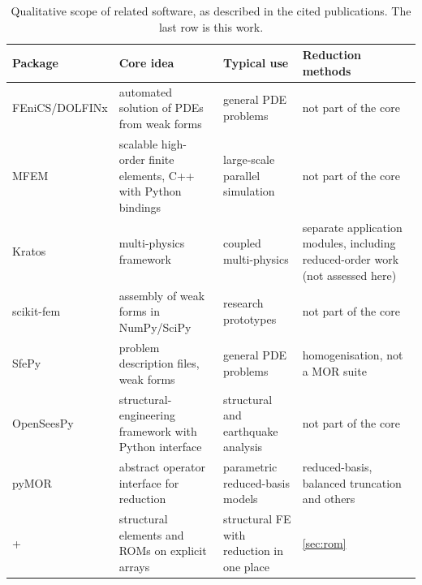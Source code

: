\begin{table}[t]
\centering\footnotesize
\caption{Qualitative scope of related software, as described in the cited publications. The last row is this work.}
\label{tab:scope}
\begin{tabular}{>{\raggedright\arraybackslash}p{2.9cm}>{\raggedright\arraybackslash}p{3.4cm}>{\raggedright\arraybackslash}p{3.9cm}>{\raggedright\arraybackslash}p{3.6cm}}
\toprule
Package & Core idea & Typical use & Reduction methods \\
\midrule
FEniCS/DOLFINx \cite{logg2012fenics,baratta2023dolfinx} & automated solution of PDEs from weak forms & general PDE problems & not part of the core \\
MFEM \cite{anderson2021mfem} & scalable high-order finite elements, C++ with Python bindings & large-scale parallel simulation & not part of the core \\
Kratos \cite{dadvand2010kratos} & multi-physics framework & coupled multi-physics & separate application modules, including reduced-order work (not assessed here) \\
scikit-fem \cite{gustafsson2020skfem} & assembly of weak forms in NumPy/SciPy & research prototypes & not part of the core \\
SfePy \cite{cimrman2019sfepy} & problem description files, weak forms & general PDE problems & homogenisation, not a MOR suite \\
OpenSeesPy \cite{zhu2018openseespy} & structural-engineering framework with Python interface & structural and earthquake analysis & not part of the core \\
pyMOR \cite{milk2016pymor} & abstract operator interface for reduction & parametric reduced-basis models & reduced-basis, balanced truncation and others \\
\midrule
\fea{} + \rom{} & structural elements and ROMs on explicit arrays & structural FE with reduction in one place & \cref{sec:rom} \\
\bottomrule
\end{tabular}
\end{table}
